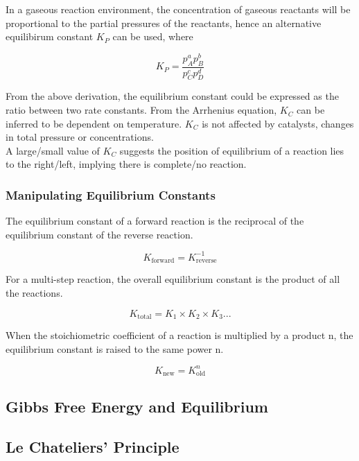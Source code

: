 \documentclass[../main]{subfiles}
\begin{document}

	In a gaseous reaction environment, the concentration of gaseous reactants will be proportional to the partial pressures of the reactants, hence an alternative equilibirum constant \(K_P\) can be used, where

	\[ K_P = \frac{p_A^a p_B^b}{p_C^c p_D^d} \]

	From the above derivation, the equilibrium constant could be expressed as the ratio between two rate constants. From the Arrhenius equation, \(K_C\) can be inferred to be dependent on temperature. \(K_C\) is not affected by catalysts, changes in total pressure or concentrations. \\

	A large/small value of \(K_C\) suggests the position of equilibrium of a reaction lies to the right/left, implying there is complete/no reaction.

	\subsubsection{Manipulating Equilibrium Constants}

	The equilibrium constant of a forward reaction is the reciprocal of the equilibrium constant of the reverse reaction.

	\[ K_\text{forward} = K_\text{reverse}^{-1} \]

	For a multi-step reaction, the overall equilibrium constant is the product of all the reactions.

	\[ K_\text{total} = K_1 \times K_2 \times K_3 ... \]

	When the stoichiometric coefficient of a reaction is multiplied by a product n, the equilibrium constant is raised to the same power n.

	\[ K_\text{new} = K_\text{old}^n\]

	\subsection{Gibbs Free Energy and Equilibrium}

	\subsection{Le Chateliers' Principle}

\end{document}
